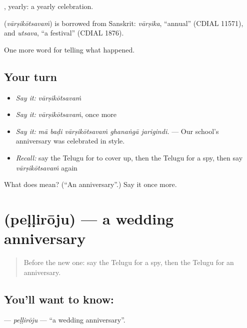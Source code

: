 , yearly: a yearly celebration.

\begin{cousinweb}
\textbf{} (\emph{vārṣikōtsavaṁ}) is borrowed from Sanskrit: \emph{vārṣika}, \textquotedblleft{}annual\textquotedblright{} (CDIAL 11571), and \emph{utsava}, \textquotedblleft{}a festival\textquotedblright{} (CDIAL 1876).
\end{cousinweb}

\begin{grammarlens}[title={What you've built}]
One more word for telling what happened.
\end{grammarlens}

\subsection*{Your turn}
\begin{itemize}
\raggedright
  \item \emph{Say it:} \emph{vārṣikōtsavaṁ}
  \item \emph{Say it:} \emph{vārṣikōtsavaṁ}, once more
  \item \emph{Say it:} \emph{mā baḍi vārṣikōtsavaṁ ghanaṅgā jarigindi.} — Our school's anniversary was celebrated in style.
  \item \emph{Recall:} say the Telugu for to cover up, then the Telugu for a spy, then say \emph{vārṣikōtsavaṁ} again
\end{itemize}

\begin{tcolorbox}[breakable,colback=teal!4,colframe=teal!35!black,title={Before you move on}]
What does  mean? (\textquotedblleft{}An anniversary\textquotedblright{}.) Say it once more.
\end{tcolorbox}
\section[\texorpdfstring{\te{పెళ్ళిరోజు} (peḷḷirōju)}{పెళ్ళిరోజు (peḷḷirōju)}]{ (peḷḷirōju) — a wedding anniversary}

\label{lesson:TE-C355-pelliroju}



\begin{quote}
Before the new one: say the Telugu for a spy, then the Telugu for an anniversary.
\end{quote}

\subsection*{You'll want to know: }
\textbf{} — \emph{peḷḷirōju} — \textquotedblleft{}a wedding anniversary\textquotedblright{}.

